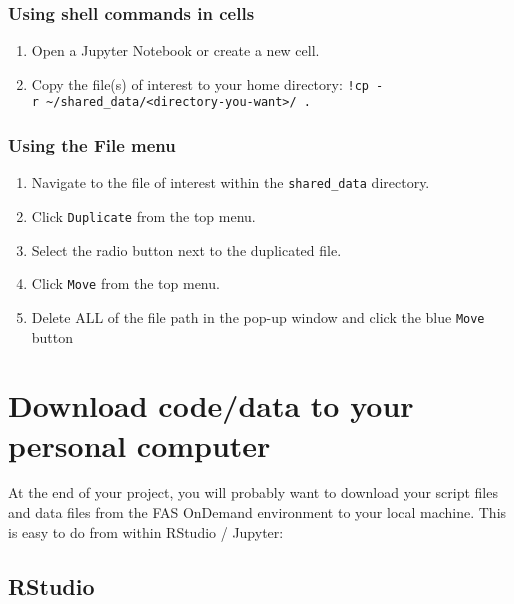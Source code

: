 \documentclass[]{book}
\providecommand{\tightlist}{%
  \setlength{\itemsep}{0pt}\setlength{\parskip}{0pt}}
\begin{document}
\hypertarget{using-shell-commands-in-cells}{%
\subsection{Using shell commands in cells}\label{using-shell-commands-in-cells}}

\begin{enumerate}
\def\labelenumi{\arabic{enumi}.}
\tightlist
\item
  Open a Jupyter Notebook or create a new cell.
\item
  Copy the file(s) of interest to your home directory: \texttt{!cp\ -r\ \textasciitilde{}/shared\_data/\textless{}directory-you-want\textgreater{}/\ .}
\end{enumerate}

\hypertarget{using-the-file-menu-1}{%
\subsection{Using the File menu}\label{using-the-file-menu-1}}

\begin{enumerate}
\def\labelenumi{\arabic{enumi}.}
\tightlist
\item
  Navigate to the file of interest within the \texttt{shared\_data} directory.
\item
  Click \texttt{Duplicate} from the top menu.
\item
  Select the radio button next to the duplicated file.
\item
  Click \texttt{Move} from the top menu.
\item
  Delete ALL of the file path in the pop-up window and click the blue \texttt{Move} button
\end{enumerate}

\hypertarget{download-codedata-to-your-personal-computer}{%
\chapter{Download code/data to your personal computer}\label{download-codedata-to-your-personal-computer}}

At the end of your project, you will probably want to download your script files and data files from the FAS OnDemand environment to your local machine. This is easy to do from within RStudio / Jupyter:

\hypertarget{rstudio-2}{%
\section{RStudio}\label{rstudio-2}}
\end{document}
